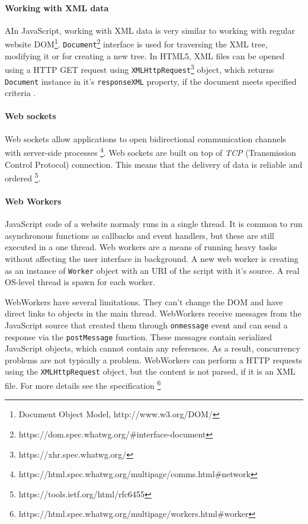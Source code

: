 \paragraph{Working with XML data}
AIn JavaScript, working with XML data is very similar to working with regular website DOM\footnote{Document Object Model, http://www.w3.org/DOM/}. \verb|Document|\footnote{https://dom.spec.whatwg.org/\#interface-document} interface is used for traversing the XML tree, modifying it or for creating a new tree. In HTML5, XML files can be opened using a HTTP GET request using \verb|XMLHttpRequest|\footnote{https://xhr.spec.whatwg.org/} object, which returns \verb|Document| instance in it's \verb|responseXML| property, if the document meets specified criteria \cite{xhr}.

\paragraph{Web sockets}
Web sockets allow applications to open bidirectional communication channels with server-side processes \cite{}\footnote{https://html.spec.whatwg.org/multipage/comms.html\#network}. Web sockets are built on top of \textit{TCP} (Transmission Control Protocol) connection. This means that the delivery of data is reliable and ordered \cite{}\footnote{https://tools.ietf.org/html/rfc6455}.

\paragraph{Web Workers}
JavaScript code of a website normaly runs in a single thread. It is common to run asynchronous functions as callbacks and event handlers, but these are still executed in a one thread. Web workers are a means of running heavy tasks without affecting the user interface in background. A new web worker is creating as an instance of \verb|Worker| object with an URI of the script with it's source. A real OS-level thread is spawn for each worker.

WebWorkers have several limitations. They can't change the DOM and have direct links to objects in the main thread. WebWorkers receive messages from the JavaScript source that created them through \verb|onmessage| event and can send a response via the \verb|postMessage| function. These messages contain serialized JavaScript objects, which cannot contain any references. As a result, concurrency problems are not typically a problem. WebWorkers can perform a HTTP requests using the \verb|XMLHttpRequest| object, but the content is not parsed, if it is an XML file. For more details see the specification \cite{} \footnote{https://html.spec.whatwg.org/multipage/workers.html\#worker}





